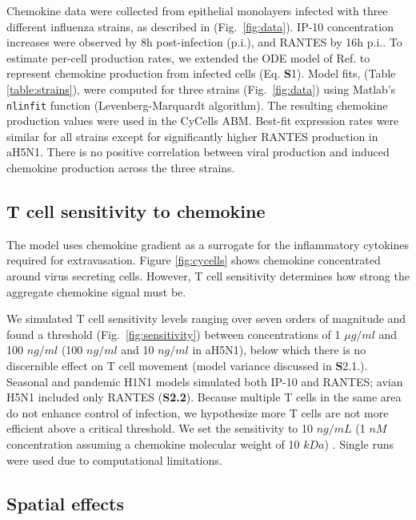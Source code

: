 \documentclass[10pt]{article}
\begin{document}
Chemokine data were collected from epithelial monolayers infected with three different influenza strains, as described in \cite{Mitchell2011} (Fig.~\ref{fig:data}).  IP-10 concentration increases were observed by 8h post-infection (p.i.), and RANTES by 16h p.i..  To estimate per-cell production rates, we extended the ODE model of Ref. \cite{Mitchell2011} to represent chemokine production from infected cells (Eq. \textbf{S}1).  Model fits, (Table \ref{table:strains}), were computed for three strains (Fig.~\ref{fig:data}) using Matlab's \texttt{nlinfit} function (Levenberg-Marquardt algorithm).  The resulting chemokine production values were used in the CyCells ABM.  Best-fit expression rates were similar for all strains except for significantly higher RANTES production in aH5N1.  There is no positive correlation between viral production and induced chemokine production across the three strains.


\subsection*{T cell sensitivity to chemokine}

The model uses chemokine gradient as a surrogate for the inflammatory cytokines required for extravasation.  Figure \ref{fig:cycells} shows chemokine concentrated around virus secreting cells.  However, T cell sensitivity determines how strong the aggregate chemokine signal must be.

We simulated T cell sensitivity levels ranging over seven orders of magnitude and found a threshold (Fig.~\ref{fig:sensitivity}) between concentrations of 1 $\mu g/ml$ and 100 $ng/ml$ (100 $ng/ml$ and 10 $ng/ml$ in aH5N1), below which there is no discernible effect on T cell movement (model variance discussed in \textbf{S}2.1.).  Seasonal and pandemic H1N1 models simulated both IP-10 and RANTES; avian H5N1 included only RANTES (\textbf{S2.2}).  Because multiple T cells in the same area do not enhance control of infection, we hypothesize more T cells are not more efficient above a critical threshold.  We set the sensitivity to 10 $ng/mL$ (1 $nM$ concentration assuming a chemokine molecular weight of 10 $kDa$) \cite{Gao2003}.  Single runs were used due to computational limitations.  


\subsection*{Spatial effects}
\end{document}
